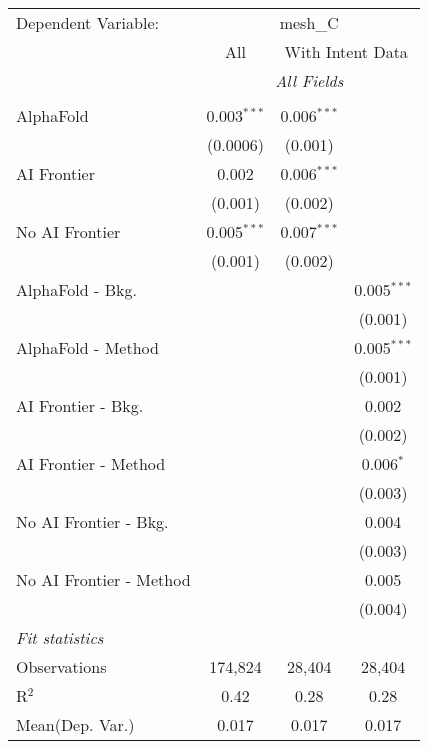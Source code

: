 \begingroup
\centering
\begin{tabular}{lccc}
   \tabularnewline \midrule \midrule
   Dependent Variable: & \multicolumn{3}{c}{mesh\_C}\\
 & \multicolumn{1}{c}{All} & \multicolumn{2}{c}{With Intent Data} \\
\cmidrule(lr){2-2} \cmidrule(lr){3-4}
 & \multicolumn{3}{c}{\textit{All Fields}} \\ \\
   AlphaFold               & 0.003$^{***}$ & 0.006$^{***}$ &   \\   
                           & (0.0006)      & (0.001)       &   \\   
   AI Frontier             & 0.002         & 0.006$^{***}$ &   \\   
                           & (0.001)       & (0.002)       &   \\   
   No AI Frontier          & 0.005$^{***}$ & 0.007$^{***}$ &   \\   
                           & (0.001)       & (0.002)       &   \\   
   AlphaFold - Bkg.        &               &               & 0.005$^{***}$\\   
                           &               &               & (0.001)\\   
   AlphaFold - Method      &               &               & 0.005$^{***}$\\   
                           &               &               & (0.001)\\   
   AI Frontier - Bkg.      &               &               & 0.002\\   
                           &               &               & (0.002)\\   
   AI Frontier - Method    &               &               & 0.006$^{*}$\\   
                           &               &               & (0.003)\\   
   No AI Frontier - Bkg.   &               &               & 0.004\\   
                           &               &               & (0.003)\\   
   No AI Frontier - Method &               &               & 0.005\\   
                           &               &               & (0.004)\\   
   \midrule
   \emph{Fit statistics}\\
   Observations            & 174,824       & 28,404        & 28,404\\  
   R$^2$                   & 0.42          & 0.28          & 0.28\\  
Mean(Dep. Var.) & 0.017 & 0.017 & 0.017 \\
   

\end{tabular}
